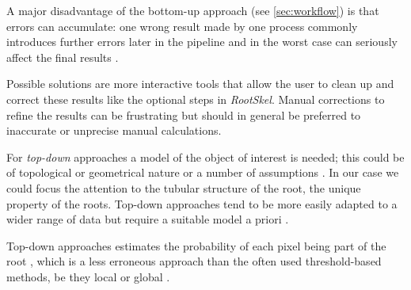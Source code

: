 A major disadvantage of the bottom-up approach (see \ref{sec:workflow}) is that errors can accumulate: one wrong result made by one process commonly introduces further errors later in the pipeline and in the worst case can seriously affect the final results \cite{pound2013rootnav}.

Possible solutions are more interactive tools that allow the user to clean up and correct these results \cite{armengaud2009ez,clark20113} like the optional steps in \textit{RootSkel}. Manual corrections to refine the results can be frustrating but should in general be preferred to inaccurate or unprecise manual calculations.

For \textit{top-down} approaches a model of the object of interest is needed; this could be of topological or geometrical nature \cite{pound2012cellset,taub1996root} or a number of assumptions \cite{mooney2012developing}. In our case we could focus the attention to the tubular structure of the root, the unique property of the roots. Top-down approaches tend to be more easily adapted to a wider range of data but require a suitable model a priori  \cite{pound2013rootnav}.

Top-down approaches estimates the probability of each pixel being part of the root \cite{pound2013rootnav}, which is a less erroneous approach than the often used threshold-based methods, be they local or global \cite{pound2013rootnav}. 



